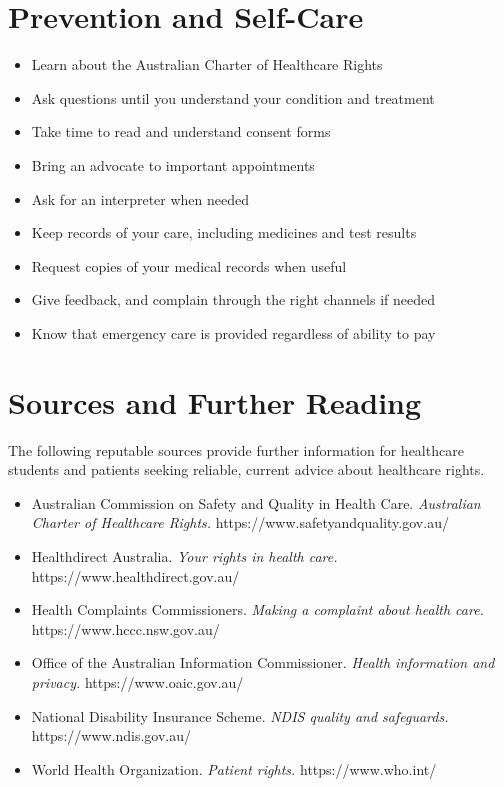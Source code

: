 \section*{Prevention and Self-Care}
\begin{itemize}
    \item Learn about the Australian Charter of Healthcare Rights
    \item Ask questions until you understand your condition and treatment
    \item Take time to read and understand consent forms
    \item Bring an advocate to important appointments
    \item Ask for an interpreter when needed
    \item Keep records of your care, including medicines and test results
    \item Request copies of your medical records when useful
    \item Give feedback, and complain through the right channels if needed
    \item Know that emergency care is provided regardless of ability to pay
\end{itemize}

\section*{Sources and Further Reading}
The following reputable sources provide further information for healthcare students and patients seeking reliable, current advice about healthcare rights.

\begin{itemize}
    \item Australian Commission on Safety and Quality in Health Care. \textit{Australian Charter of Healthcare Rights.} https://www.safetyandquality.gov.au/
    \item Healthdirect Australia. \textit{Your rights in health care.} https://www.healthdirect.gov.au/
    \item Health Complaints Commissioners. \textit{Making a complaint about health care.} https://www.hccc.nsw.gov.au/
    \item Office of the Australian Information Commissioner. \textit{Health information and privacy.} https://www.oaic.gov.au/
    \item National Disability Insurance Scheme. \textit{NDIS quality and safeguards.} https://www.ndis.gov.au/
    \item World Health Organization. \textit{Patient rights.} https://www.who.int/
\end{itemize}
